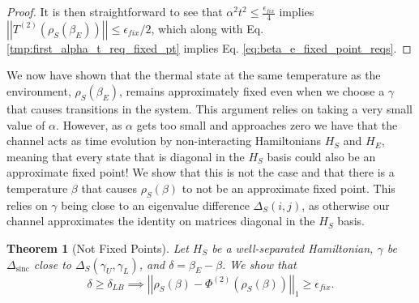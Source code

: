 \documentclass{article}
\newtheorem{theorem}{Theorem}
\newcommand{\norm}[1]{\left| \left| #1 \right| \right|}
\DeclareMathOperator{\sinc}{sinc}
\begin{document}
\begin{proof}
    It is then straightforward to see that $\alpha^2 t^2 \leq \frac{\epsilon_{fix}}{4}$ implies $\norm{T^{(2)}(\rho_S(\beta_E))} \leq \epsilon_{fix} / 2$, which along with Eq. \eqref{tmp:first_alpha_t_req_fixed_pt} implies Eq. \eqref{eq:beta_e_fixed_point_reqs}. 
\end{proof}

We now have shown that the thermal state at the same temperature as the environment, $\rho_S(\beta_E)$, remains approximately fixed even when we choose a $\gamma$ that causes transitions in the system. This argument relies on taking a very small value of $\alpha$. However, as $\alpha$ gets too small and approaches zero we have that the channel acts as time evolution by non-interacting Hamiltonians $H_S$ and $H_E$, meaning that every state that is diagonal in the $H_S$ basis could also be an approximate fixed point! We show that this is not the case and that there is a temperature $\beta$ that causes $\rho_S(\beta)$ to not be an approximate fixed point. This relies on $\gamma$ being close to an eigenvalue difference $\Delta_S(i,j)$, as otherwise our channel approximates the identity on matrices diagonal in the $H_S$ basis. 
\begin{theorem}[Not Fixed Points] \label{thm:which_beta_not_fixed}
    Let $H_S$ be a well-separated Hamiltonian, $\gamma$ be $\Delta_{\sinc}$ close to $\Delta_S(\gamma_U, \gamma_L)$, and $\delta = \beta_E - \beta$. We show that
    \begin{equation}
        \delta \geq \delta_{LB} \implies \norm{\rho_S(\beta) - \Phi^{(2)}(\rho_S(\beta))}_1 \geq \epsilon_{fix}.
    \end{equation}
\end{theorem}
\end{document}
